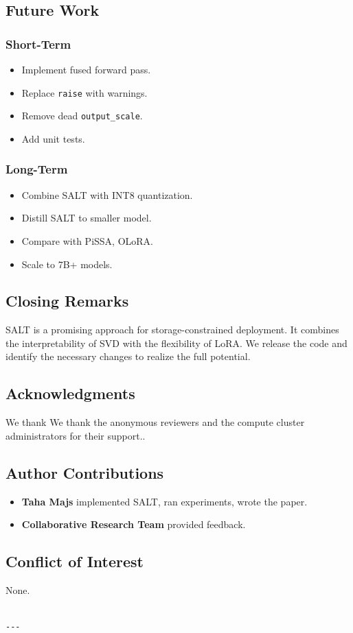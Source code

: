 \subsection{Future Work}

\subsubsection{Short-Term}

\begin{itemize}
\item Implement fused forward pass.
\item Replace \texttt{raise} with warnings.
\item Remove dead \texttt{output\_scale}.
\item Add unit tests.

\end{itemize}
\subsubsection{Long-Term}

\begin{itemize}
\item Combine SALT with INT8 quantization.
\item Distill SALT to smaller model.
\item Compare with PiSSA, OLoRA.
\item Scale to 7B+ models.

\end{itemize}
\subsection{Closing Remarks}

SALT is a promising approach for storage-constrained deployment. It combines 
the interpretability of SVD with the flexibility of LoRA. We release the 
code and identify the necessary changes to realize the full potential.

\subsection{Acknowledgments}

We thank We thank the anonymous reviewers and the compute cluster administrators for their support..

\subsection{Author Contributions}

\begin{itemize}
\item \textbf{Taha Majs} implemented SALT, ran experiments, wrote the paper.
\item \textbf{Collaborative Research Team} provided feedback.

\end{itemize}
\subsection{Conflict of Interest}

None.
\begin{lstlisting}

---
\end{lstlisting}